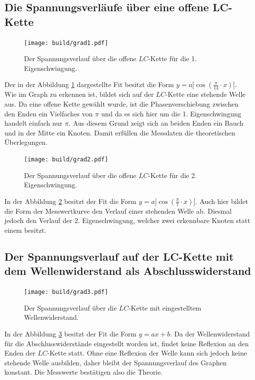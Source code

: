 \subsection{Die Spannungsverläufe über eine offene LC-Kette}

\begin{figure}[H]
	\centering
	\caption{Der Spannungsverlauf über die offene $LC$-Kette für die 1. Eigenschwingung.}
	\texttt{[image: build/grad1.pdf]}
	\label{fig:grad1}
\end{figure}

\hspace{1.8ex} Der in der Abbildung \ref{fig:grad1} dargestellte Fit besitzt die Form $y = a  |\cos(\frac{\pi}{14} \cdot x)|$. Wie im Graph zu erkennen ist, bildet sich auf der $LC$-Kette eine stehende Welle aus.
 Da eine offene Kette gewählt wurde, ist die Phasenverschiebung zwischen den Enden ein Vielfaches
  von $\pi$ und da es sich hier um die 1. Eigenschwingung handelt einfach nur $\pi$. Aus diesem Grund zeigt
 sich an beiden Enden ein Bauch und in der Mitte ein Knoten. Damit erfüllen die Messdaten die theoretischen Überlegungen.
\begin{figure}[H]
	\centering
	\caption{Der Spannungsverlauf über die offene $LC$-Kette für die 2. Eigenschwingung.}
	\texttt{[image: build/grad2.pdf]}
	\label{fig:grad2}
\end{figure}
In der Abbildung \ref{fig:grad2} besitzt der Fit die Form $y = a  |\cos(\frac{\pi}{7} \cdot x)|$. Auch hier bildet die Form der Messwertkurve den Verlauf einer stehenden Welle ab. Diesmal jedoch den Verlauf der 2. Eigenschwingung, welcher zwei erkennbare Knoten statt einem besitzt.

\subsection{Der Spannungsverlauf auf der LC-Kette mit dem Wellenwiderstand als Abschlusswiderstand}
\begin{figure}[H]
	\centering
	\caption{Der Spannungsverlauf über die $LC$-Kette mit eingestelltem Wellenwiderstand.}
	\texttt{[image: build/grad3.pdf]}
	\label{fig:grad3}
\end{figure}

In der Abbildung \ref{fig:grad3} besitzt der Fit die Form $y = a  x + b$. Da der Wellenwiderstand für die Abschlusswiderstände eingestellt worden ist, findet keine Reflexion an den Enden der $LC$-Kette statt. Ohne eine Reflexion der Welle kann sich jedoch keine stehende Welle ausbilden, daher bleibt der Spannungsverlauf des Graphen konstant. Die Messwerte bestätigen also die Theorie.

